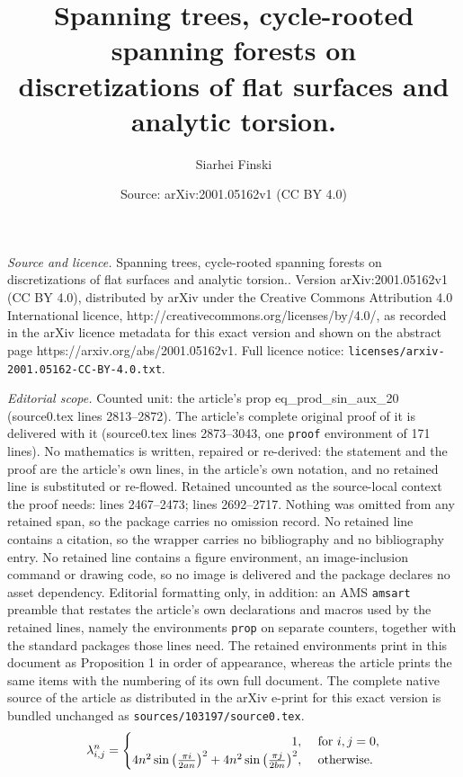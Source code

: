 \documentclass[10pt,a4paper]{amsart}
\title{Spanning trees, cycle-rooted spanning forests on\\ discretizations of flat surfaces and analytic torsion.}
\author{Siarhei Finski}
\date{Source: arXiv:2001.05162v1 (CC BY 4.0)}
\begin{document}
\maketitle

\noindent\emph{Source and licence.} Spanning trees, cycle-rooted spanning forests on\\ discretizations of flat surfaces and analytic torsion.. Version arXiv:2001.05162v1 (CC BY 4.0), distributed by arXiv under the Creative Commons Attribution 4.0 International licence, http://creativecommons.org/licenses/by/4.0/, as recorded in the arXiv licence metadata for this exact version and shown on the abstract page https://arxiv.org/abs/2001.05162v1. Full licence notice: \texttt{licenses/arxiv-2001.05162-CC-BY-4.0.txt}.\par\smallskip

\noindent\textit{Editorial scope.} Counted unit: the article's prop eq\_prod\_sin\_aux\_20 (source0.tex lines 2813--2872). The article's complete original proof of it is delivered with it (source0.tex lines 2873--3043, one \texttt{proof} environment of 171 lines). No mathematics is written, repaired or re-derived: the statement and the proof are the article's own lines, in the article's own notation, and no retained line is substituted or re-flowed.  Retained uncounted as the source-local context the proof needs: lines 2467--2473; lines 2692--2717.  Nothing was omitted from any retained span, so the package carries no omission record.  No retained line contains a citation, so the wrapper carries no bibliography and no bibliography entry.  No retained line contains a figure environment, an image-inclusion command or drawing code, so no image is delivered and the package declares no asset dependency.  Editorial formatting only, in addition: an AMS \texttt{amsart} preamble that restates the article's own declarations and macros used by the retained lines, namely the environments \texttt{prop} on separate counters, together with the standard packages those lines need.  The retained environments print in this document as Proposition 1 in order of appearance, whereas the article prints the same items with the numbering of its own full document.  The complete native source of the article as distributed in the arXiv e-print for this exact version is bundled unchanged as \texttt{sources/103197/source0.tex}.
		\begin{equation}\label{eq_eigenval_sq}
			\lambda^{n}_{i, j} = 
			\begin{cases} 
				\hfill 1, & \text{ for } i, j = 0, \\
				\hfill 4 n^2 \sin  \big( \frac{\pi i}{2 a n} \big)^2 + 4 n^2 \sin  \big( \frac{\pi j}{2 b n} \big)^2, & \text{ otherwise.}
 			\end{cases}
		\end{equation}
\end{document}
